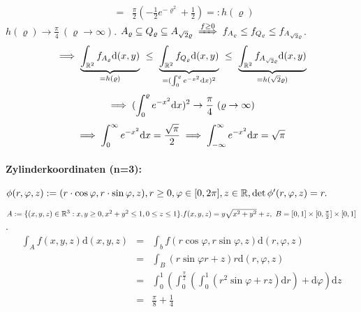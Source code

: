 \documentclass[a4paper,twoside,DIV15,BCOR12mm]{scrbook}
\begin{document}
\begin{beispiele}
\begin{eqnarray*}
&=&\frac{\pi}{2}(-\frac{1}{2}e^{-\varrho^2}+\frac{1}{2}) =: h(\varrho)
\end{eqnarray*}
$h(\varrho)\to\frac{\pi}{4}\ (\varrho\to\infty)$. $A_\varrho\subseteq Q_\varrho\subseteq A_{\sqrt{2}\varrho}\folgtwegen{f\ge 0}f_{A_\varrho}\le f_{Q_\varrho}\le f_{A_{\sqrt{2}\varrho}}$.
\[
	\folgt
	\underbrace{\int_{\MdR^2}f_{A_\varrho}\text{d}(x,y)}_{=h(\varrho)}\ \le\ 
	\underbrace{\int_{\MdR^2}f_{Q_\varrho}\text{d}(x,y)}_{=(\int_0^\varrho e^{-x^2}\text{d}x)^2}\ \le\ 
	\underbrace{\int_{\MdR^2}f_{A_{\sqrt{2}\varrho}}\text{d}(x,y)}_{=h(\sqrt{2}\varrho)}
\]
\[
	\folgt
	(\int_0^\varrho e^{-x^2}\text{d}x)^2\to\frac{\pi}{4}\ (\varrho\to\infty)
\]
\[
	\implies
	\int_0^\infty e^{-x^2}\text{d}x=\frac{\sqrt{\pi}}{2}\implies\int_{-\infty}^\infty e^{-x^2}\text{d}x=\sqrt{\pi}
\]
\end{beispiele}

\paragraph{Zylinderkoordinaten (n=3):} $ $\\
$\phi(r,\varphi,z):=(r\cdot \cos\varphi, r\cdot\sin\varphi, z), r\ge 0, \varphi\in[0,2\pi], z\in\mathbb{R}, \det\phi'(r,\varphi,z)=r.$
\begin{beispiel}
$A:=\{(x,y,z)\in\MdR^3: x,y\ge 0, x^2+y^2\le 1, 0\le z\le 1\}.\\
f(x,y,z)=y\sqrt{x^2+y^2}+z,\ B=[0,1]\times[0,\frac{\pi}{2}]\times[0,1]$. 
\begin{eqnarray*}
\int_A f(x,y,z)\text{d}(x,y,z) & = & \int_b f(r\cos\varphi, r\sin\varphi,z)\text{d}(r,\varphi,z)\\
& = &\int_B(r\sin\varphi r+z)r\text{d}(r,\varphi,z)\\
& = &\int_0^1(\int_0^{\frac{\pi}{2}}(\int_0^1(r^2\sin\varphi+rz)\text{d}r)+\text{d}\varphi)\text{d}z\\
& = & \frac{\pi}{8}+\frac{1}{4}
\end{eqnarray*}
\end{beispiel}
\end{document}
